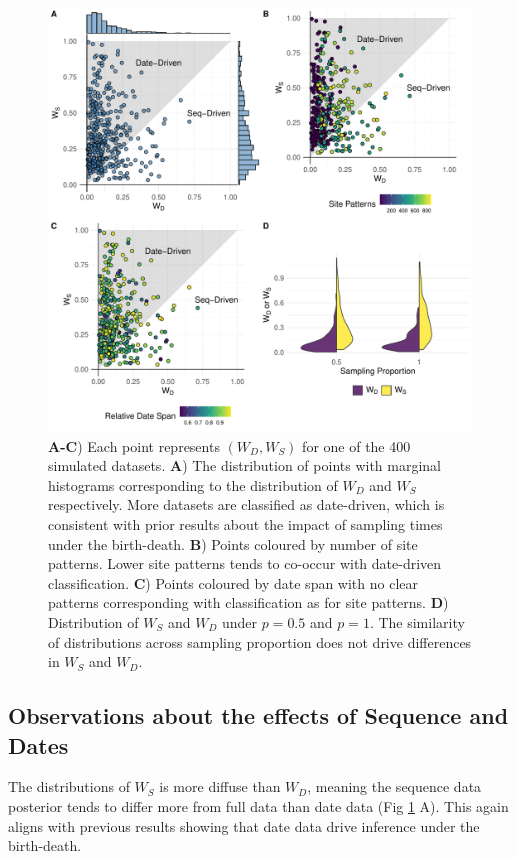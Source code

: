 \documentclass{article}
\begin{document}
\begin{figure}[H]
\centering
\includegraphics[width=1\linewidth]{figures/wassersteinDistro.pdf}
\caption{\textbf{A-C}) Each point represents $(W_D, W_S)$ for one of the 400 simulated datasets. \textbf{A}) The distribution of points with marginal histograms corresponding to the distribution of $W_D$ and $W_S$ respectively. More datasets are classified as date-driven, which is consistent with prior results about the impact of sampling times under the birth-death. \textbf{B}) Points coloured by number of site patterns. Lower site patterns tends to co-occur with date-driven classification. \textbf{C}) Points coloured by date span with no clear patterns corresponding with classification as for site patterns. \textbf{D}) Distribution of $W_S$ and $W_D$ under $p=0.5$ and $p=1$. The similarity of distributions across sampling proportion does not drive differences in $W_S$ and $W_D$.}
\label{fig:wData}
\end{figure}

\subsection*{Observations about the effects of Sequence and Dates}
The distributions of $W_S$ is more diffuse than $W_D$, meaning the sequence data posterior tends to differ more from full data than date data (Fig \ref{fig:wData} A). This again aligns with previous results showing that date data drive inference under the birth-death.
\end{document}
